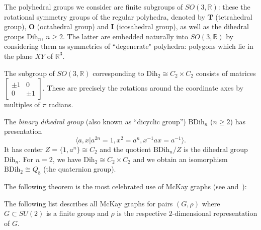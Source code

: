 {The polyhedral groups we consider are finite subgroups of $SO(3, \mathbb{R})$: these the rotational symmetry groups of the regular polyhedra, denoted by $\mathbf{T}$ (tetrahedral group), $\mathbf{O}$ (octahedral group) and $\mathbf{I}$ (icosahedral group), as well as the dihedral groups $\mathrm{Dih}_n$, $n\geq 2$. The latter are embedded naturally into $SO(3, \mathbb{R})$ by considering them as symmetries of ``degenerate" polyhedra: polygons which lie in the plane $XY$ of $\mathbb{R}^3$.

\begin{exam}\label{ex:Dih_2}
  The subgroup of $SO(3, \mathbb{R})$ corresponding to $\mathrm{Dih}_2 \cong C_2 \times C_2$ consists of matrices $ \begin{bmatrix}
  \pm 1 &0\\
  0 &\pm 1
  \end{bmatrix}$. These are precisely the rotations around the coordinate axes by multiples of $\pi$ radians.
\end{exam}}

\begin{exam}
The 
{\it binary dihedral group} (also known as ``dicyclic group'') $\mathrm{B}\mathrm{Dih}_{n}$ ($n\geq 2$) has presentation
$$\langle a, x | a^{2n} = 1, x^2=a^n, x^{-1}ax = a^{-1}\rangle.$$ It has center
$Z =\{1, a^n\}\cong C_2$ and the quotient $\mathrm{B}\mathrm{Dih}_{n}/Z$ is the dihedral group 
$\mathrm{Dih}_{n}$. For $n=2$, we have $\mathrm{Dih}_{2} \cong C_2 \times C_2$ and we obtain an 
isomorphism $\mathrm{B}\mathrm{Dih}_{2} \cong Q_8$ (the quaternion group).
\end{exam}

The following theorem is the most celebrated use of McKay graphs (see \cite[Proposition 4]{McKay} and~\cite{Steinberg}):
\begin{theorem}\label{thrm:mckay_class}
The following list describes all McKay graphs for pairs $(G, \rho)$ 
where $G\subset SU(2)$ is a finite group and $\rho$ is the respective
$2$-dimensional representation of $G$.

\end{theorem}


